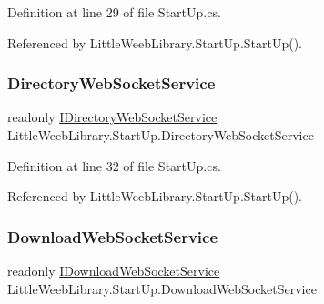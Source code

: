 Definition at line 29 of file Start\+Up.\+cs.



Referenced by Little\+Weeb\+Library.\+Start\+Up.\+Start\+Up().

\mbox{\label{class_little_weeb_library_1_1_start_up_a84bf27f74487f7ca69ddb0620378a0a8}} 
\subsubsection{\texorpdfstring{Directory\+Web\+Socket\+Service}{DirectoryWebSocketService}}
{\footnotesize\ttfamily readonly \mbox{\hyperlink{interface_little_weeb_library_1_1_services_1_1_i_directory_web_socket_service}{I\+Directory\+Web\+Socket\+Service}} Little\+Weeb\+Library.\+Start\+Up.\+Directory\+Web\+Socket\+Service\hspace{0.3cm}{\ttfamily [private]}}



Definition at line 32 of file Start\+Up.\+cs.



Referenced by Little\+Weeb\+Library.\+Start\+Up.\+Start\+Up().

\mbox{\label{class_little_weeb_library_1_1_start_up_ae6133ff8a65bb66f7525066878e4bce1}} 
\subsubsection{\texorpdfstring{Download\+Web\+Socket\+Service}{DownloadWebSocketService}}
{\footnotesize\ttfamily readonly \mbox{\hyperlink{interface_little_weeb_library_1_1_services_1_1_i_download_web_socket_service}{I\+Download\+Web\+Socket\+Service}} Little\+Weeb\+Library.\+Start\+Up.\+Download\+Web\+Socket\+Service\hspace{0.3cm}{\ttfamily [private]}}




